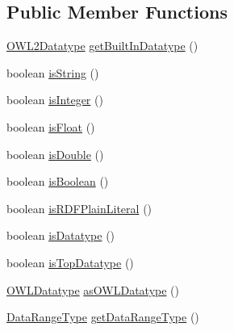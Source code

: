 \subsection*{Public Member Functions}
\begin{DoxyCompactItemize}
\item 
\hyperlink{enumorg_1_1semanticweb_1_1owlapi_1_1vocab_1_1_o_w_l2_datatype}{O\-W\-L2\-Datatype} \hyperlink{classuk_1_1ac_1_1manchester_1_1cs_1_1owl_1_1owlapi_1_1_o_w_l2_datatype_impl_ad1328649d11014aae676cf36a31c9985}{get\-Built\-In\-Datatype} ()
\item 
boolean \hyperlink{classuk_1_1ac_1_1manchester_1_1cs_1_1owl_1_1owlapi_1_1_o_w_l2_datatype_impl_a5e6f9a645f1a174ef233816b3a9de560}{is\-String} ()
\item 
boolean \hyperlink{classuk_1_1ac_1_1manchester_1_1cs_1_1owl_1_1owlapi_1_1_o_w_l2_datatype_impl_a14bc220f5011205a27a55b6cd7d2e689}{is\-Integer} ()
\item 
boolean \hyperlink{classuk_1_1ac_1_1manchester_1_1cs_1_1owl_1_1owlapi_1_1_o_w_l2_datatype_impl_a09f047cc19100357b736f9835b86781e}{is\-Float} ()
\item 
boolean \hyperlink{classuk_1_1ac_1_1manchester_1_1cs_1_1owl_1_1owlapi_1_1_o_w_l2_datatype_impl_a986a6433295fb52212d9d558a6ecdae7}{is\-Double} ()
\item 
boolean \hyperlink{classuk_1_1ac_1_1manchester_1_1cs_1_1owl_1_1owlapi_1_1_o_w_l2_datatype_impl_af9996b637459f3a87f33a61191e75a8c}{is\-Boolean} ()
\item 
boolean \hyperlink{classuk_1_1ac_1_1manchester_1_1cs_1_1owl_1_1owlapi_1_1_o_w_l2_datatype_impl_a68f50237b27468e4f2da0b8ca7f9b28c}{is\-R\-D\-F\-Plain\-Literal} ()
\item 
boolean \hyperlink{classuk_1_1ac_1_1manchester_1_1cs_1_1owl_1_1owlapi_1_1_o_w_l2_datatype_impl_a29c14d01fa8660f617c6990f9e9a3d5b}{is\-Datatype} ()
\item 
boolean \hyperlink{classuk_1_1ac_1_1manchester_1_1cs_1_1owl_1_1owlapi_1_1_o_w_l2_datatype_impl_aaa432de54b1997507649d1f4aed02577}{is\-Top\-Datatype} ()
\item 
\hyperlink{interfaceorg_1_1semanticweb_1_1owlapi_1_1model_1_1_o_w_l_datatype}{O\-W\-L\-Datatype} \hyperlink{classuk_1_1ac_1_1manchester_1_1cs_1_1owl_1_1owlapi_1_1_o_w_l2_datatype_impl_aea140affd11db70223df70ce1fb9e6d4}{as\-O\-W\-L\-Datatype} ()
\item 
\hyperlink{enumorg_1_1semanticweb_1_1owlapi_1_1model_1_1_data_range_type}{Data\-Range\-Type} \hyperlink{classuk_1_1ac_1_1manchester_1_1cs_1_1owl_1_1owlapi_1_1_o_w_l2_datatype_impl_a54bf8e1ea73e036b4c08b8e7974ef788}{get\-Data\-Range\-Type} ()

\end{DoxyCompactItemize}
